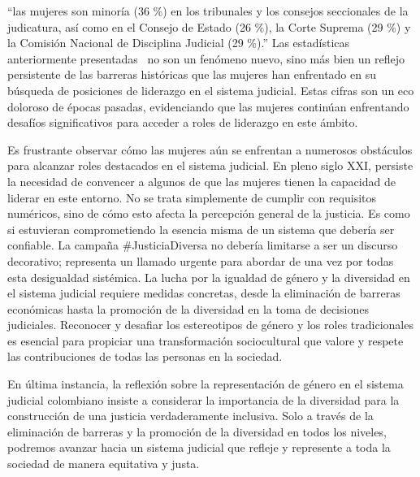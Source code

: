 \documentclass[letterpaper, 12pt]{article}
\begin{document}
“las mujeres son minoría (36 \%) en los tribunales y los consejos
seccionales de la judicatura, así como en el Consejo de Estado
(26 \%), la Corte Suprema (29 \%) y la Comisión Nacional de
Disciplina Judicial (29 \%).” Las estadísticas anteriormente
presentadas~\cite{Dejusticia_2023_MariaAdelaida} no son un fenómeno nuevo,
sino más bien un
reflejo persistente de las barreras históricas que las
mujeres han enfrentado en su búsqueda de posiciones de liderazgo
en el sistema judicial. Estas cifras son un eco doloroso de épocas
pasadas, evidenciando que las mujeres continúan enfrentando
desafíos significativos para acceder a roles de liderazgo en
este ámbito.

Es frustrante observar cómo las mujeres aún se enfrentan a
numerosos obstáculos para alcanzar roles destacados en el
sistema judicial. En pleno siglo XXI, persiste la necesidad
de convencer a algunos de que las mujeres tienen la
capacidad de liderar en este entorno. No se trata
simplemente de cumplir con requisitos numéricos, sino de
cómo esto afecta la percepción general de la justicia. Es
como si estuvieran comprometiendo la esencia misma de un
sistema que debería ser confiable. La campaña
$\#$JusticiaDiversa no debería limitarse a ser un discurso
decorativo; representa un llamado urgente para abordar de
una vez por todas esta desigualdad sistémica. La lucha por
la igualdad de género y la diversidad en el sistema
judicial requiere medidas concretas, desde la eliminación
de barreras económicas hasta la promoción de la diversidad
en la toma de decisiones judiciales. Reconocer y desafiar
los estereotipos de género y los roles tradicionales es
esencial para propiciar una transformación sociocultural
que valore y respete las contribuciones de todas las
personas en la sociedad.

En última instancia, la reflexión sobre la representación
de género en el sistema judicial colombiano insiste a
considerar la importancia de la diversidad para la
construcción de una justicia verdaderamente inclusiva. Solo
a través de la eliminación de barreras y la promoción de la
diversidad en todos los niveles, podremos avanzar hacia un
sistema judicial que refleje y represente a toda la
sociedad de manera equitativa y justa.

\nocite{Colprensa_2016}
\nocite{FiscalíaGeneralNación_2022}
\nocite{Vacía_Vacía_2023}
\nocite{agenda}

\printbibliography
\end{document}

